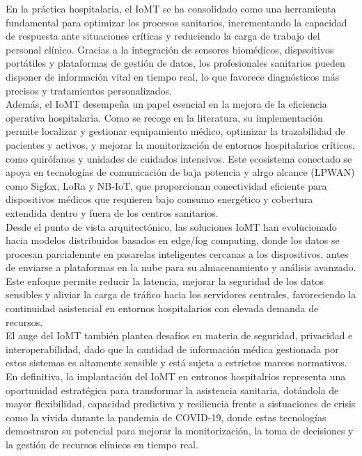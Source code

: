En la práctica hospitalaria, el IoMT se ha consolidado como una herramienta fundamental para optimizar los procesos sanitarios, incrementando la capacidad de respuesta ante situaciones
críticas y reduciendo la carga de trabajo del personal clínico. Gracias a la integración de sensores biomédicos, dispsoitivos portátiles y plataformas de gestión de datos, 
los profesionales sanitarios pueden disponer de información vital en tiempo real, lo que favorece diagnósticos más precisos y tratamientos personalizados. \\ 

Además, el IoMT desempeña un papel esencial en la mejora de la eficiencia operativa hospitalaria. Como se recoge en la literatura, su implementación permite localizar y gestionar
equipamiento médico, optimizar la trazabilidad de pacientes y activos, y mejorar la monitorización de entornos hospitalarios críticos, como quirófanos y unidades de cuidados intensivos.
Este ecosistema conectado se apoya en tecnologías de comunicación de baja potencia y alrgo alcance (LPWAN) como Sigfox, LoRa y NB-IoT, que proporcionan conectividad eficiente para
dispositivos médicos que requieren bajo consumo energético y cobertura extendida dentro y fuera de los centros sanitarios. \\

Desde el punto de vista arquitectónico, las soluciones IoMT han evolucionado hacia modelos distribuidos basados en edge/fog computing, donde los datos se procesan parcialemnte
en pasarelas inteligentes cercanas a los dispositivos, antes de enviarse a plataformas en la nube para su almacenamiento y análisis avanzado. Este enfoque permite reducir la 
latencia, mejorar la seguridad de los datos sensibles y aliviar la carga de tráfico hacia los servidores centrales, favoreciendo la continuidad asistencial en entornos hospitalarios
con elevada demanda de recursos. \\

El auge del IoMT también plantea desafíos en materia de seguridad, privacidad e interoperabilidad, dado que la cantidad de información médica gestionada por estos sistemas es altamente 
sensible y está sujeta a estrictos marcos normativos. \\

En definitiva, la implantación del IoMT en entronos hospitalrios representa una oportunidad estratégica para transformar la asistencia sanitaria, dotándola de mayor flexibilidad, 
capacidad predictiva y resiliencia frente a sistuaciones de crisis como la vivida durante la pandemia de COVID-19, donde estas tecnologías demostraron su potencial para mejorar la 
monitorización, la toma de decisiones y la gestión de recursos clínicos en tiempo real.
